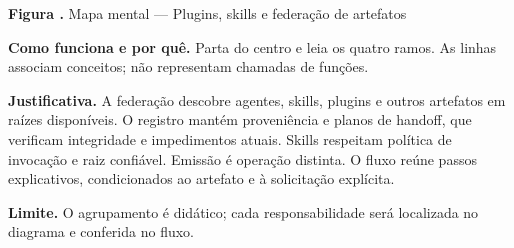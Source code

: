 {\small\textbf{Figura \thefigure.} Mapa mental --- Plugins, skills e federação de artefatos}\par\smallskip
\noindent\textbf{Como funciona e por quê.} Parta do centro e leia os quatro ramos. As linhas associam conceitos; não representam chamadas de funções.\par
\noindent\textbf{Justificativa.} A federação descobre agentes, skills, plugins e outros artefatos em raízes disponíveis. O registro mantém proveniência e planos de handoff, que verificam integridade e impedimentos atuais. Skills respeitam política de invocação e raiz confiável. Emissão é operação distinta. O fluxo reúne passos explicativos, condicionados ao artefato e à solicitação explícita.\par
\noindent\textbf{Limite.} O agrupamento é didático; cada responsabilidade será localizada no diagrama e conferida no fluxo.\par\smallskip
{}
